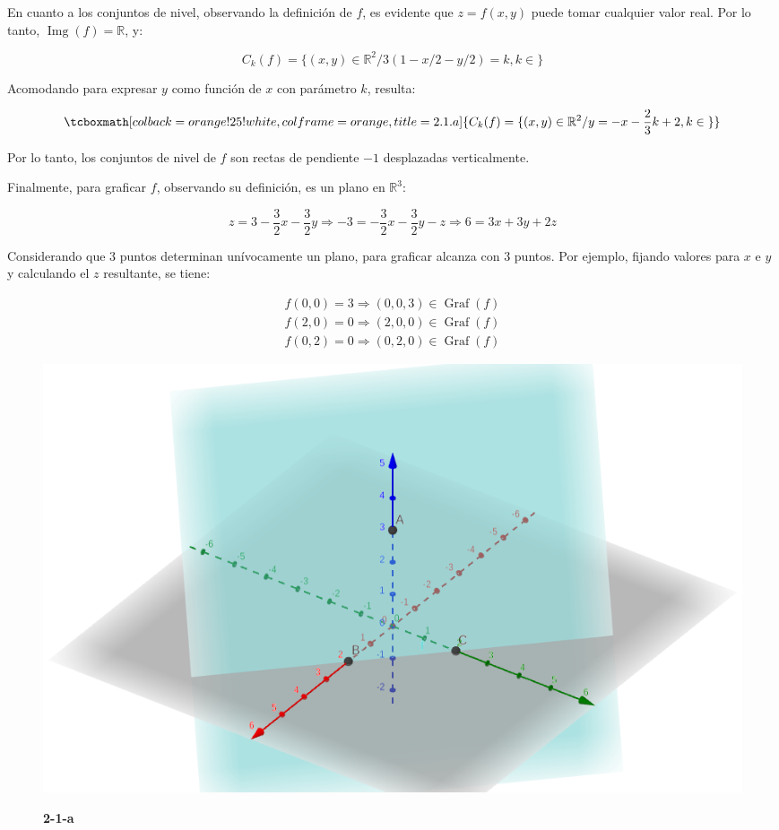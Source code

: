 \documentclass{article}
\renewcommand{\Bbb}{\mathbb}
\begin{document}
En cuanto a los conjuntos de nivel, observando la definición de $f$, es evidente que $z = f(x,y)$ puede tomar cualquier valor real. Por lo tanto, $\mathop{Img}(f) = \Bbb R$, y:

\begin{equation}
C_k(f) = \{ (x,y) \in \Bbb R^2 / 3(1-x/2-y/2) = k, k \in \Bbb \}
\end{equation}

Acomodando para expresar $y$ como función de $x$ con parámetro $k$, resulta:

\begin{equation}
\tcboxmath[colback=orange!25!white,colframe=orange,title=2.1.a]
{
C_k(f) = \{ (x,y) \in \Bbb R^2 / y = -x -\frac{2}{3}k + 2, k \in \Bbb \}
}
\end{equation}

Por lo tanto, los conjuntos de nivel de $f$ son rectas de pendiente $-1$ desplazadas verticalmente.

Finalmente, para graficar $f$, observando su definición, es un plano en $\Bbb R^3$:

\begin{equation}
z = 3 -\frac{3}{2} x - \frac{3}{2} y \Rightarrow -3 = -\frac{3}{2}x -\frac{3}{2}y -z \Rightarrow 6 = 3x +3y +2z 
\end{equation}

Considerando que 3 puntos determinan unívocamente un plano, para graficar alcanza con 3 puntos. Por ejemplo, fijando valores para $x$ e $y$ y calculando el $z$ resultante, se tiene:

\begin{equation}
\begin{array}{ll}
f(0,0) = 3 \Rightarrow (0, 0, 3) \in \mathop{Graf}(f) \\
f(2,0) = 0 \Rightarrow (2, 0, 0) \in \mathop{Graf}(f) \\
f(0,2) = 0 \Rightarrow (0, 2, 0) \in \mathop{Graf}(f)
\end{array}
\end{equation}

\begin{figure}[ht]
\caption{\textbf{2-1-a}}
\includegraphics[scale=0.4]{img/ejercicios/2/1-a.png} 
\centering
\label{fig:2-1-a}
\end{figure}
\end{document}
